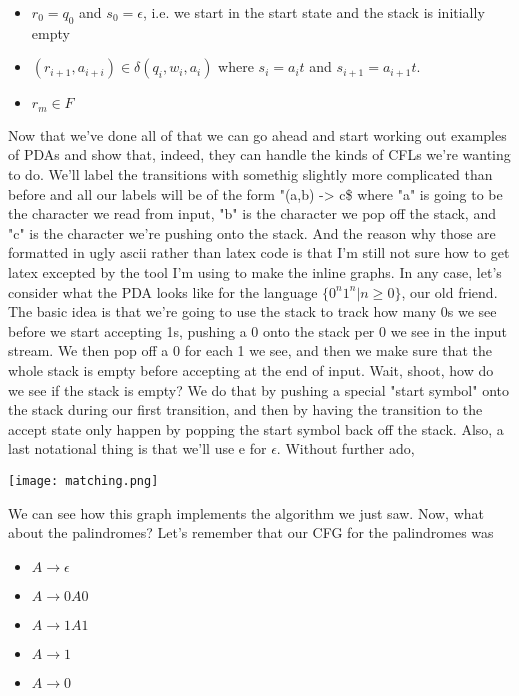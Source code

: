 \documentclass[11pt]{article}
\begin{document}
\begin{itemize}
\item $r_0 = q_0$ and $s_0 = \epsilon$, i.e. we start in the start state and the stack is initially empty
\item $(r_{i+1},a_{i+i}) \in \delta(q_i,w_i,a_i)$ where $s_i = a_i t$ and $s_{i+1} = a_{i+1} t$.
\item $r_m \in F$
\end{itemize}

Now that we've done all of that we can go ahead and start working out examples of PDAs and show that, indeed, they can handle the kinds of CFLs we're wanting to do. We'll label the transitions with somethig slightly more complicated than before and all our labels will be of the form "(a,b) -> c\$ where "a" is going to be the character we read from input, "b" is the character we pop off the stack, and "c" is the character we're pushing onto the stack. And the reason why those are formatted in ugly ascii rather than latex code is that I'm still not sure how to get latex excepted by the tool I'm using to make the inline graphs. In any case, let's consider what the PDA looks like for the language $\{0^n1^n | n \geq 0\}$, our old friend. The basic idea is that we're going to use the stack to track how many 0s we see before we start accepting 1s, pushing a 0 onto the stack per 0 we see in the input stream. We then pop off a 0 for each 1 we see, and then we make sure that the whole stack is empty before accepting at the end of input. Wait, shoot, how do we see if the stack is empty? We do that by pushing a special "start symbol" onto the stack during our first transition, and then by having the transition to the accept state only happen by popping the start symbol back off the stack. Also, a last notational thing is that we'll use e for $\epsilon$. Without further ado,

\texttt{[image: matching.png]}

We can see how this graph implements the algorithm we just saw. Now, what about the palindromes? Let's remember that our CFG for the palindromes was

\begin{itemize}
\item $A \to \epsilon$
\item $A \to 0A0$
\item $A \to 1A1$
\item $A \to 1$
\item $A \to 0$
\end{itemize}
\end{document}
